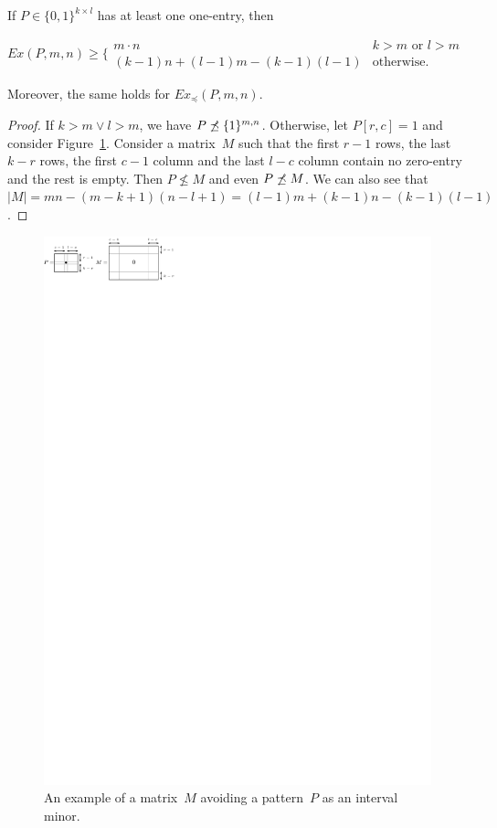 \begin{lemma}
If $P\in\{0,1\}^{k\times l}$ has at least one one-entry, then

$Ex(P,m,n)\geq\Big\{\begin{array}{ll}
m\cdot n & k>m\text{ or } l>m \\
(k-1)n+(l-1)m-(k-1)(l-1) & \text{otherwise.}
\end{array}$

Moreover, the same holds for $Ex_{\preceq}(P,m,n).$
\end{lemma}
\begin{proof}
If $k>m\vee l>m$, we have $P\not\preceq\{1\}^{m,n}$. Otherwise, let $P[r,c]=1$ and consider Figure~\ref{fig:minimalist}. Consider a matrix~$M$ such that the first $r-1$ rows, the last $k-r$ rows, the first $c-1$ column and the last $l-c$ column contain no zero-entry and the rest is empty. Then $P\not\leq M$ and even $P\not\preceq M$. We can also see that $|M|=mn-(m-k+1)(n-l+1)=(l-1)m+(k-1)n-(k-1)(l-1)$.
\end{proof}
\begin{figure}[!ht]
\centering
\includegraphics[width=120mm]{img/minimalist.pdf}
\caption{An example of a matrix~$M$ avoiding a pattern~$P$ as an interval minor.}
\label{fig:minimalist}
\end{figure}

